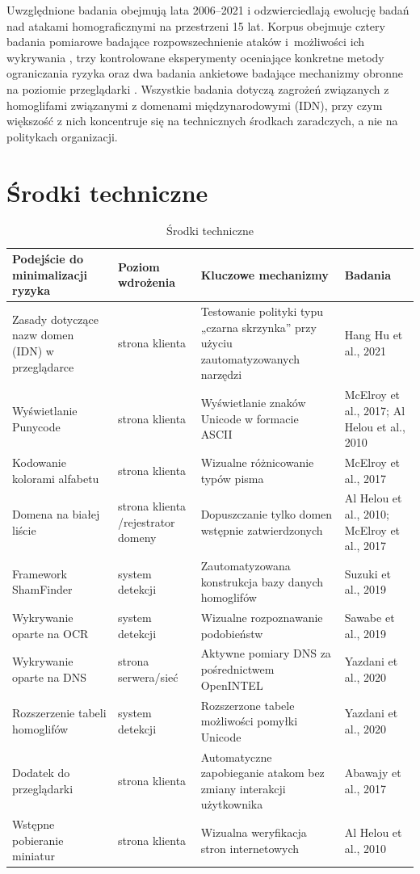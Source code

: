 Uwzględnione badania obejmują lata 2006–2021 i odzwierciedlają ewolucję badań nad atakami homograficznymi na przestrzeni 15 lat. Korpus obejmuje cztery badania pomiarowe badające rozpowszechnienie ataków i~możliwości ich wykrywania \cite{Suzuki2019}, trzy kontrolowane eksperymenty oceniające konkretne metody ograniczania ryzyka \cite{McElroy2017} oraz dwa badania ankietowe badające mechanizmy obronne na poziomie przeglądarki \cite{Hu2021}. Wszystkie badania dotyczą zagrożeń związanych z homoglifami związanymi z domenami międzynarodowymi (IDN), przy czym większość z nich koncentruje się na technicznych środkach zaradczych, a nie na politykach organizacji.

\section{Środki techniczne}
\begin{table}[h]
\centering
\caption{Środki techniczne}
\label{tab:techniczneTab}
{\footnotesize
\begin{tabularx}{\textwidth}{LLp{4cm}L}
\toprule
\textbf{Podejście do minimalizacji ryzyka} & \textbf{Poziom wdrożenia} & \textbf{
Kluczowe mechanizmy} & \textbf{Badania} \\ \midrule
Zasady dotyczące nazw domen (IDN) w przeglądarce  &  strona klienta  & Testowanie polityki typu „czarna skrzynka” przy użyciu zautomatyzowanych narzędzi & Hang Hu et al., 2021 \\
Wyświetlanie Punycode  & strona klienta & Wyświetlanie znaków Unicode w formacie ASCII & McElroy et al., 2017; Al Helou et al., 2010 \\ 
Kodowanie kolorami alfabetu  & strona klienta & Wizualne różnicowanie typów pisma & McElroy et al., 2017 \\ 
Domena na białej liście  & strona klienta /rejestrator domeny & Dopuszczanie tylko domen wstępnie zatwierdzonych & Al Helou et al., 2010; McElroy et al., 2017 \\ 
Framework ShamFinder & system detekcji & Zautomatyzowana konstrukcja bazy danych homoglifów & Suzuki et al., 2019 \\ 
Wykrywanie oparte na OCR  & system detekcji & Wizualne rozpoznawanie podobieństw & Sawabe et al., 2019 \\ 
Wykrywanie oparte na DNS  & strona serwera/sieć & Aktywne pomiary DNS za pośrednictwem OpenINTEL & Yazdani et al., 2020 \\ 
Rozszerzenie tabeli homoglifów  & system detekcji & Rozszerzone tabele możliwości pomyłki Unicode & Yazdani et al., 2020 \\ 
Dodatek do przeglądarki  & strona klienta & Automatyczne zapobieganie atakom bez zmiany interakcji użytkownika & Abawajy et al., 2017 \\ 
Wstępne pobieranie miniatur & strona klienta & Wizualna weryfikacja stron internetowych & Al Helou et al., 2010 \\ \bottomrule
\end{tabularx}
}

\end{table}


